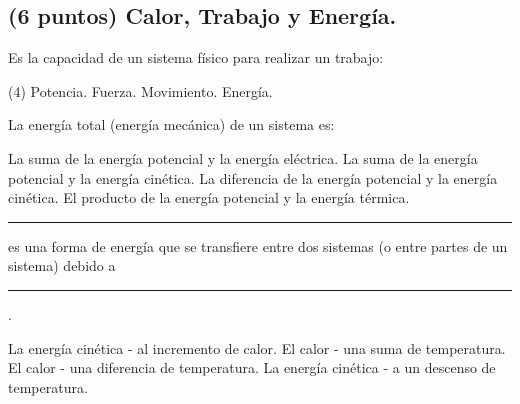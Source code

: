 \documentclass[12pt, letter]{exam}
\begin{document}
\begin{questions}
    \section{(6 puntos) Calor, Trabajo y Energía.}
    
    \question Es la capacidad de un sistema físico para realizar un trabajo:
    \begin{tasks}(4)
        \task Potencia.
        \task Fuerza.
        \task Movimiento.
        \task Energía.
    \end{tasks}
    \question La energía total (energía mecánica) de un sistema es:
    \begin{tasks}
        \task La suma de la energía potencial y la energía eléctrica.
        \task La suma de la energía potencial y la energía cinética.
        \task La diferencia de la energía potencial y la energía cinética.
        \task El producto de la energía potencial y la energía térmica.
    \end{tasks}
    \question \rule{2cm}{0.1mm} es una forma de energía que se transfiere entre dos sistemas (o entre partes de un sistema) debido a \rule{2cm}{0.1mm}.
    \begin{tasks}
        \task La energía cinética - al incremento de calor.
        \task El calor - una suma de temperatura.
        \task El calor - una diferencia de temperatura.
        \task La energía cinética - a un descenso de temperatura.
    \end{tasks}
    

\end{questions}
\end{document}
